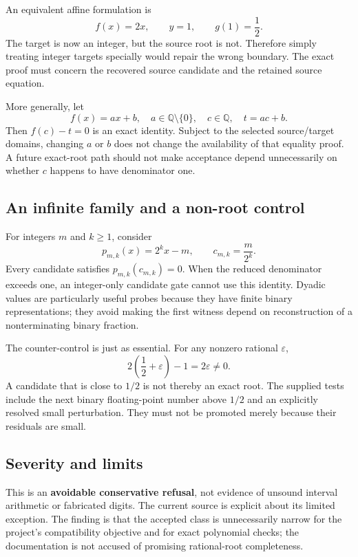 \documentclass[11pt,letterpaper]{article}
\begin{document}
An equivalent affine formulation is
\[
 f(x)=2x,\qquad y=1,\qquad g(1)=\frac12.
\]
The target is now an integer, but the source root is not. Therefore simply treating integer targets specially would repair the wrong boundary. The exact proof must concern the recovered source candidate and the retained source equation.

More generally, let
\[
 f(x)=a x+b,\quad a\in\mathbb Q\setminus\{0\},\quad
 c\in\mathbb Q,\quad t=ac+b.
\]
Then $f(c)-t=0$ is an exact identity. Subject to the selected source/target domains, changing $a$ or $b$ does not change the availability of that equality proof. A future exact-root path should not make acceptance depend unnecessarily on whether $c$ happens to have denominator one.

\subsection{An infinite family and a non-root control}

For integers $m$ and $k\geq1$, consider
\[
 p_{m,k}(x)=2^k x-m,\qquad c_{m,k}=\frac{m}{2^k}.
\]
Every candidate satisfies $p_{m,k}(c_{m,k})=0$. When the reduced denominator exceeds one, an integer-only candidate gate cannot use this identity. Dyadic values are particularly useful probes because they have finite binary representations; they avoid making the first witness depend on reconstruction of a nonterminating binary fraction.

The counter-control is just as essential. For any nonzero rational $\varepsilon$,
\[
 2\left(\frac12+\varepsilon\right)-1=2\varepsilon\ne0.
\]
A candidate that is close to $1/2$ is not thereby an exact root. The supplied tests include the next binary floating-point number above $1/2$ and an explicitly resolved small perturbation. They must not be promoted merely because their residuals are small.

\subsection{Severity and limits}

This is an \textbf{avoidable conservative refusal}, not evidence of unsound interval arithmetic or fabricated digits. The current source is explicit about its limited exception. The finding is that the accepted class is unnecessarily narrow for the project's compatibility objective and for exact polynomial checks; the documentation is not accused of promising rational-root completeness.\cite{mathics-numeric,status}
\end{document}
